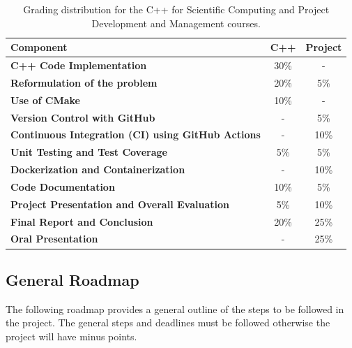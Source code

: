 \documentclass[11pt,a4paper]{article}
\begin{document}
\begin{table}[htbp]
    \centering
    \begin{tabular}{lcc}
    \toprule
    \textbf{Component}                               & \textbf{C++} & \textbf{Project} \\ \midrule
    \textbf{C++ Code Implementation}                              & 30\%                 & -             \\
    \textbf{Reformulation of the problem}                         & 20\%                 & 5\%          \\
    \textbf{Use of CMake}                                         & 10\%                 & -             \\
    \textbf{Version Control with GitHub}                          & -                    & 5\%          \\
    \textbf{Continuous Integration (CI) using GitHub Actions}     & -                    & 10\%          \\
    \textbf{Unit Testing and Test Coverage}                       & 5\%                  & 5\%          \\
    \textbf{Dockerization and Containerization}                   & -                    & 10\%          \\
    \textbf{Code Documentation}                                   & 10\%                 & 5\%          \\
    \textbf{Project Presentation and Overall Evaluation}          & 5\%                 & 10\%          \\
    \textbf{Final Report and Conclusion}                          & 20\%                 & 25\%          \\
    \textbf{Oral Presentation}                                    & -                    & 25\%          \\
    \bottomrule
    \end{tabular}
    \caption{Grading distribution for the C++ for Scientific Computing and Project Development and Management courses.}
\end{table}

\subsection{General Roadmap}

The following roadmap provides a general outline of the steps to be followed in the project. 
The general steps and deadlines must be followed otherwise the project will have minus points.
\end{document}
